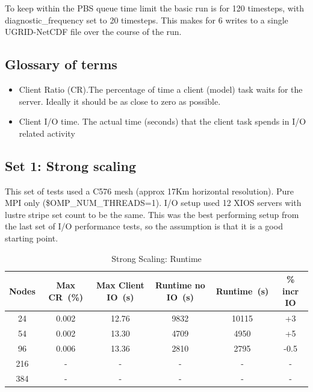 To keep within the PBS queue time limit the basic run is for 120 timesteps, with diagnostic\_frequency set to 20 timesteps.
This makes for 6 writes to a single UGRID-NetCDF file over the course of the run.

\subsection{Glossary of terms}

 
\begin{itemize}
  \item Client Ratio (CR).The percentage of time a client (model) task waits for the server. Ideally it should be as close to zero as possible.
  \item Client I/O time. The actual time (seconds) that the client task spends in I/O related activity
\end{itemize} 



\subsection{Set 1: Strong scaling}

This set of tests used a C576 mesh (approx 17Km horizontal resolution). Pure MPI only (\$OMP\_NUM\_THREADS=1). 
I/O setup used 12 XIOS servers with lustre stripe set count to be the same. This was the best performing setup from
the last set of I/O performance tests, so the assumption is that it is a good starting point.

\begin{table}[ht!]
\scriptsize
  \begin{center}
    \caption{Strong Scaling: Runtime}
    \label{tab:table1}
     \begin{tabular}{|c|c|c|c|c|c|}
      \textbf{Nodes} & \textbf{Max CR~(\%)} & \textbf{Max Client IO~(s)} & \textbf{Runtime no IO~(s)} & \textbf{Runtime~(s)} & \textbf{\% incr IO}\\
      \hline
      24 & 0.002 & 12.76 & 9832 & 10115 & +3\\
      54 & 0.002 & 13.30 & 4709 & 4950 & +5\\
      96 & 0.006 & 13.36 & 2810 & 2795 & -0.5\\
      216 & - & - & - & - & - \\
      384 & - & - & - & - & - \\
    \end{tabular}
  \end{center}
\end{table}

